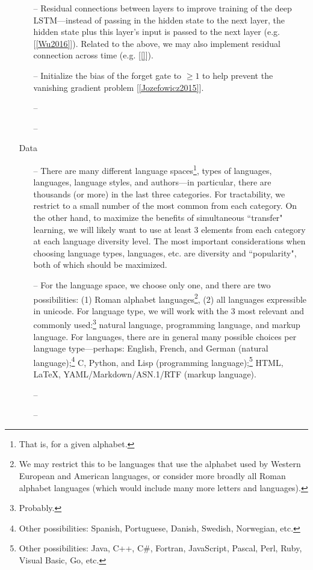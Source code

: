 \documentclass[12pt,letterpaper]{article}
\theoremstyle{remark}
\theoremstyle{plain}
\begin{document}
\begin{enumerate}
\begin{enumerate}
\item[--] Residual connections between layers to improve training of the deep LSTM---instead of passing in the hidden state to the next layer, the hidden state plus this layer's input is passed to the next layer (e.g. [\ref{Wu2016}]). Related to the above, we may also implement residual connection across time (e.g. [\ref{}]).
\item[--] Initialize the bias of the forget gate to $\geqslant 1$ to help prevent the vanishing gradient problem [\ref{Jozefowicz2015}].
\item[--] 
\item[--] 
\end{enumerate}
\item[] Data
\begin{enumerate}
\item[--] There are many different language spaces\footnote{That is, for a given alphabet.}, types of languages, languages, language styles, and authors---in particular, there are thousands (or more) in the last three categories. For tractability, we restrict to a small number of the most common from each category. On the other hand, to maximize the benefits of simultaneous ``transfer" learning, we will likely want to use at least 3 elements from each category at each language diversity level. The most important considerations when choosing language types, languages, etc. are diversity and ``popularity", both of which should be maximized. 
\item[--] For the language space, we choose only one, and there are two possibilities: (1) Roman alphabet languages\footnote{We may restrict this to be languages that use the alphabet used by Western European and American languages, or consider more broadly all Roman alphabet languages (which would include many more letters and languages).}, (2) all languages expressible in unicode. For language type, we will work with the 3 most relevant and commonly used:\footnote{Probably.} natural language, programming language, and markup language. For languages, there are in general many possible choices per language type---perhaps: English, French, and German (natural language);\footnote{Other possibilities: Spanish, Portuguese, Danish, Swedish, Norwegian, etc.} C, Python, and Lisp (programming language);\footnote{Other possibilities: Java, C++, C\#, Fortran, JavaScript, Pascal, Perl, Ruby, Visual Basic, Go, etc.} HTML, \LaTeX, YAML/Markdown/ASN.1/RTF (markup language).
\item[--] 
\item[--] 

\end{enumerate}
\end{enumerate}
\end{document}
